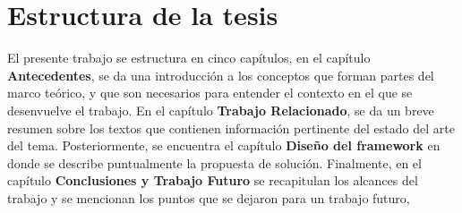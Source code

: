 \section {Estructura de la tesis}

El presente trabajo se estructura en cinco capítulos, en el capítulo \textbf{Antecedentes}, se da una introducción a los conceptos que forman partes del marco teórico, y que son necesarios para entender el contexto en el que se desenvuelve el trabajo. En el capítulo \textbf{Trabajo Relacionado}, se da un breve resumen sobre los textos que contienen información pertinente del estado del arte del tema. Posteriormente, se encuentra el capítulo \textbf{Diseño del framework} en donde se describe puntualmente la propuesta de solución. Finalmente, en el capítulo \textbf{Conclusiones y Trabajo Futuro} se recapitulan los alcances del trabajo y se mencionan los puntos que se dejaron para un trabajo futuro,

